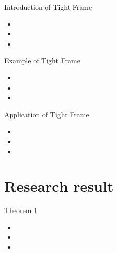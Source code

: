 \documentclass{beamer}
\begin{document}
\begin{frame}{Introduction of Tight Frame}
  \begin{itemize}
    \item 
    \item 
    \item 
  \end{itemize}
\end{frame}

\begin{frame}{Example of Tight Frame}
  \begin{itemize}
    \item 
    \item 
    \item 
  \end{itemize}
\end{frame}

\begin{frame}{Application of Tight Frame}
  \begin{itemize}
    \item 
    \item 
    \item 
  \end{itemize}
\end{frame}


\section{Research result}
\begin{frame}{Theorem 1}
  \begin{itemize}
    \item 
    \item 
    \item 
  \end{itemize}
\end{frame}
\end{document}
